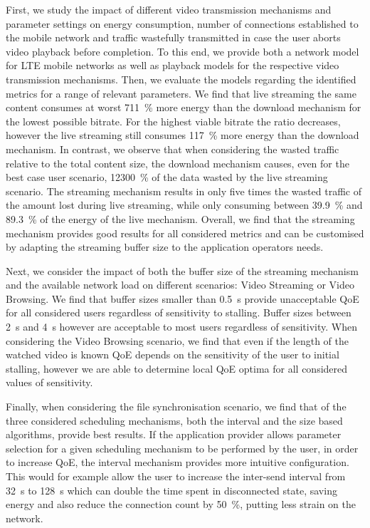 First, we study the impact of different video transmission mechanisms and parameter settings on energy consumption, number of connections established to the mobile network and traffic wastefully transmitted in case the user aborts video playback before completion.
To this end, we provide both a network model for \gls{LTE} mobile networks as well as playback models for the respective video transmission mechanisms.
Then, we evaluate the models regarding the identified metrics for a range of relevant parameters.
We find that live streaming the same content consumes at worst \SI{711}{\percent} more energy than the download mechanism for the lowest possible bitrate. For the highest viable bitrate the ratio decreases, however the live streaming still consumes \SI{117}{\percent} more energy than the download mechanism.
In contrast, we observe that when considering the wasted traffic relative to the total content size, the download mechanism causes, even for the best case user scenario, \SI{12300}{\percent} of the data wasted by the live streaming scenario.
The streaming mechanism results in only five times the wasted traffic of the amount lost during live streaming, while only consuming between \SI{39.9}{\percent} and \SI{89.3}{\percent} of the energy of the live mechanism.	
Overall, we find that the streaming mechanism provides good results for all considered metrics and can be customised by adapting the streaming buffer size to the application operators needs. 

Next, we consider the impact of both the buffer size of the streaming mechanism and the available network load on different scenarios: Video Streaming or Video Browsing.
We find that buffer sizes smaller than \SI{0.5}{\second} provide unacceptable \gls{QoE} for all considered users regardless of sensitivity to stalling.
Buffer sizes between \SI{2}{\second} and \SI{4}{\second} however are acceptable to most users regardless of sensitivity.
When considering the Video Browsing scenario, we find that even if the length of the watched video is known \gls{QoE} depends on the sensitivity of the user to initial stalling, however we are able to determine local \gls{QoE} optima for all considered values of sensitivity.

Finally, when considering the file synchronisation scenario, we find that of the three considered scheduling mechanisms, both the interval and the size based algorithms, provide best results.
If the application provider allows parameter selection for a given scheduling mechanism to be performed by the user, in order to increase \gls{QoE}, the interval mechanism provides more intuitive configuration.
This would for example allow the user to increase the inter-send interval from \SI{32}{\second} to \SI{128}{\second} which can double the time spent in disconnected state, saving energy and also reduce the connection count by \SI{50}{\percent}, putting less strain on the network.

